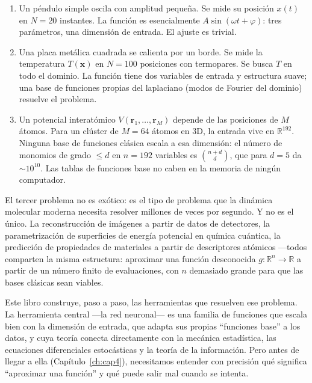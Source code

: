 \begin{enumerate}
  \item Un péndulo simple oscila con amplitud pequeña. Se mide su posición
        $x(t)$ en $N = 20$ instantes. La función es esencialmente
        $A\sin(\omega t + \varphi)$: tres parámetros, una dimensión de
        entrada. El ajuste es trivial.
  \item Una placa metálica cuadrada se calienta por un borde. Se mide la
        temperatura $T(\bm{x})$ en $N = 100$ posiciones con termopares.
        Se busca $T$ en todo el dominio. La función tiene dos variables
        de entrada y estructura suave; una base de funciones propias del
        laplaciano (modos de Fourier del dominio) resuelve el problema.
  \item Un potencial interatómico $V(\bm{r}_1, \ldots, \bm{r}_M)$
        depende de las posiciones de $M$ átomos. Para un clúster de
        $M = 64$ átomos en 3D, la entrada vive en $\mathbb{R}^{192}$.
        Ninguna base de funciones clásica escala a esa dimensión: el
        número de monomios de grado $\leq d$ en $n = 192$ variables
        es $\binom{n+d}{d}$, que para $d = 5$ da $\sim 10^{10}$.
        Las tablas de funciones base no caben en la memoria de ningún
        computador.
\end{enumerate}

El tercer problema no es exótico: es el tipo de problema que la dinámica
molecular moderna necesita resolver millones de veces por segundo. Y no
es el único. La reconstrucción de imágenes a partir de datos de detectores,
la parametrización de superficies de energía potencial en química cuántica,
la predicción de propiedades de materiales a partir de descriptores
atómicos —todos comparten la misma estructura: aproximar una función
desconocida $g: \mathbb{R}^n \to \mathbb{R}$ a partir de un número finito
de evaluaciones, con $n$ demasiado grande para que las bases clásicas sean
viables.

Este libro construye, paso a paso, las herramientas que resuelven ese
problema. La herramienta central —la red neuronal— es una familia de
funciones que escala bien con la dimensión de entrada, que adapta sus
propias ``funciones base'' a los datos, y cuya teoría conecta directamente
con la mecánica estadística, las ecuaciones diferenciales estocásticas y
la teoría de la información. Pero antes de llegar a ella (Capítulo~\ref{ch:cap4}),
necesitamos entender con precisión qué significa ``aproximar una función''
y qué puede salir mal cuando se intenta.

